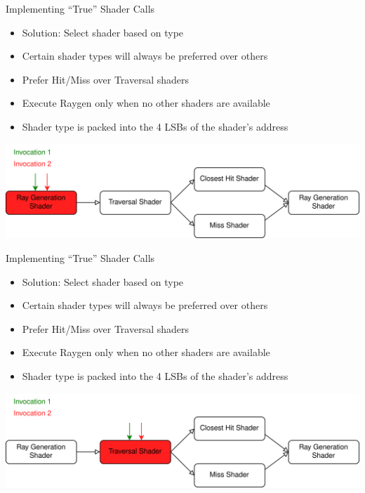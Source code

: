 \documentclass[aspectratio=169,t]{beamer}
\begin{document}
\begin{slide}{Implementing ``True'' Shader Calls}
 \begin{itemize}
  \item Solution: Select shader based on type
  \item Certain shader types will always be preferred over others
  \item Prefer Hit/Miss over Traversal shaders
  \item Execute Raygen only when no other shaders are available
  \item Shader type is packed into the 4 LSBs of the shader's address
 \end{itemize}
 \includegraphics[width=\textwidth]{graphics/RTStages2-1.png}
\end{slide}

\begin{slide}{Implementing ``True'' Shader Calls}
 \begin{itemize}
  \item Solution: Select shader based on type
  \item Certain shader types will always be preferred over others
  \item Prefer Hit/Miss over Traversal shaders
  \item Execute Raygen only when no other shaders are available
  \item Shader type is packed into the 4 LSBs of the shader's address
 \end{itemize}
 \includegraphics[width=\textwidth]{graphics/RTStages2-2.png}
\end{slide}
\end{document}
